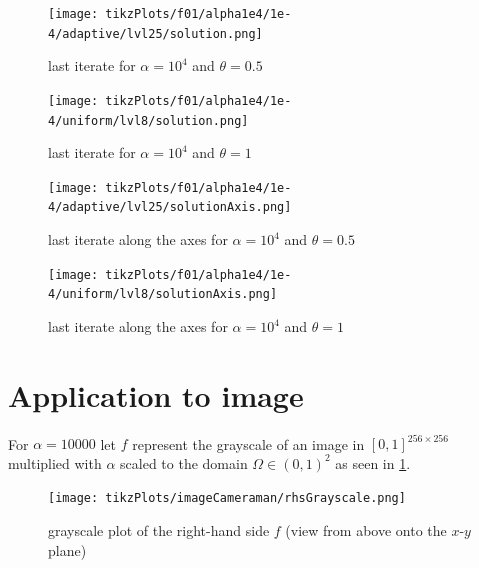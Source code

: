 \documentclass[draft=false,twoside,12pt]{scrreprt}
\begin{document}
\begin{minipage}[t]{0.45\textwidth}
  \begin{figure}[H]
	  \centering
		\texttt{[image: tikzPlots/f01/alpha1e4/1e-4/adaptive/lvl25/solution.png]} 
    \caption{last iterate for $\alpha=10^4$ and $\theta = 0.5$}
  \end{figure}
\end{minipage}
\hfill
\vline
\hfill
\begin{minipage}[t]{0.45\textwidth}
  \begin{figure}[H]
	  \centering
		\texttt{[image: tikzPlots/f01/alpha1e4/1e-4/uniform/lvl8/solution.png]} 
    \caption{last iterate for $\alpha=10^4$ and $\theta = 1$}
  \end{figure}
\end{minipage}

\vspace{-\parskip}
\begin{minipage}[t]{0.45\textwidth}
  \begin{figure}[H]
	  \centering
		\texttt{[image: tikzPlots/f01/alpha1e4/1e-4/adaptive/lvl25/solutionAxis.png]} 
    \caption{last iterate along the axes for $\alpha=10^4$ and $\theta = 0.5$}
  \end{figure}
\end{minipage}
\hfill
\vline
\hfill
\begin{minipage}[t]{0.45\textwidth}
  \begin{figure}[H]
	  \centering
		\texttt{[image: tikzPlots/f01/alpha1e4/1e-4/uniform/lvl8/solutionAxis.png]} 
    \caption{last iterate along the axes for $\alpha=10^4$ and $\theta = 1$}
  \end{figure}
\end{minipage}
\section{Application to image}
For $\alpha = 10000$ let $f$ represent the grayscale of an image in
$[0,1]^{256\times 256}$ multiplied with $\alpha$ scaled to the domain
$\Omega\in(0,1)^2$ as seen in \cref{fig:rhsCameraman}.

\begin{figure}[H]
	\centering
	\texttt{[image: tikzPlots/imageCameraman/rhsGrayscale.png]}
  \caption{grayscale plot of the right-hand side $f$ (view from above onto the
  $x$-$y$ plane)}
  \label{fig:rhsCameraman}
\end{figure}
\end{document}
